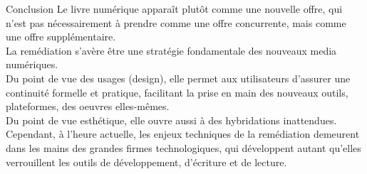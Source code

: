 \begin{frame}{Conclusion}
Le livre numérique apparaît plutôt comme une nouvelle offre, qui n'est pas nécessairement à prendre comme une offre concurrente, mais comme une offre supplémentaire.\\ 
La remédiation s'avère être une stratégie fondamentale des nouveaux media numériques.\\ 
Du point de vue des usages (design), elle permet aux utilisateurs d'assurer une continuité formelle et pratique, facilitant la prise en main des nouveaux outils, plateformes, des oeuvres elles-mêmes.\\ 
Du point de vue esthétique, elle ouvre aussi à des hybridations inattendues. Cependant, à l'heure actuelle, les enjeux techniques de la remédiation demeurent dans les mains des grandes firmes technologiques, qui développent autant qu'elles verrouillent les outils de développement, d'écriture et de lecture.
\end{frame}